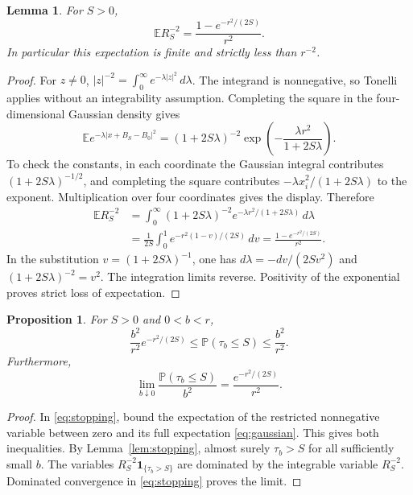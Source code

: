 \documentclass[11pt]{article}
\newtheorem{lemma}[theorem]{Lemma}
\newtheorem{proposition}[theorem]{Proposition}
\theoremstyle{remark}\newtheorem{remark}[theorem]{Remark}
\newcommand{\E}{\mathbb E}\newcommand{\Pp}{\mathbb P}
\begin{document}
\begin{lemma}\label{lem:gaussian}
For $S>0$,
\begin{equation}\label{eq:gaussian}
 \E R_S^{-2}=\frac{1-e^{-r^2/(2S)}}{r^2}.
\end{equation}
In particular this expectation is finite and strictly less than $r^{-2}$.
\end{lemma}
\begin{proof}
For $z\ne0$, $|z|^{-2}=\int_0^\infty e^{-\lambda|z|^2}\,d\lambda$. The integrand is nonnegative, so Tonelli applies without an integrability assumption. Completing the square in the four-dimensional Gaussian density gives
\[
 \E e^{-\lambda|x+B_S-B_0|^2}
 =(1+2S\lambda)^{-2}
   \exp\left(-\frac{\lambda r^2}{1+2S\lambda}\right).
\]
To check the constants, in each coordinate the Gaussian integral contributes $(1+2S\lambda)^{-1/2}$, and completing the square contributes $-\lambda x_i^2/(1+2S\lambda)$ to the exponent. Multiplication over four coordinates gives the display. Therefore
\begin{align*}
 \E R_S^{-2}
 &=\int_0^\infty(1+2S\lambda)^{-2}
      e^{-\lambda r^2/(1+2S\lambda)}\,d\lambda\\
 &=\frac1{2S}\int_0^1
      e^{-r^2(1-v)/(2S)}\,dv
 =\frac{1-e^{-r^2/(2S)}}{r^2}.
\end{align*}
In the substitution $v=(1+2S\lambda)^{-1}$, one has $d\lambda=-dv/(2Sv^2)$ and $(1+2S\lambda)^{-2}=v^2$. The integration limits reverse. Positivity of the exponential proves strict loss of expectation.
\end{proof}

\begin{proposition}\label{prop:hitting}
For $S>0$ and $0<b<r$,
\begin{equation}\label{eq:hitting}
 \frac{b^2}{r^2}e^{-r^2/(2S)}
 \le\Pp(\tau_b\le S)\le\frac{b^2}{r^2}.
\end{equation}
Furthermore,
\begin{equation}\label{eq:hittinglimit}
 \lim_{b\downarrow0}\frac{\Pp(\tau_b\le S)}{b^2}
 =\frac{e^{-r^2/(2S)}}{r^2}.
\end{equation}
\end{proposition}
\begin{proof}
In \eqref{eq:stopping}, bound the expectation of the restricted nonnegative variable between zero and its full expectation \eqref{eq:gaussian}. This gives both inequalities. By Lemma~\ref{lem:stopping}, almost surely $\tau_b>S$ for all sufficiently small $b$. The variables $R_S^{-2}\mathbf1_{\{\tau_b>S\}}$ are dominated by the integrable variable $R_S^{-2}$. Dominated convergence in \eqref{eq:stopping} proves the limit.
\end{proof}
\end{document}
